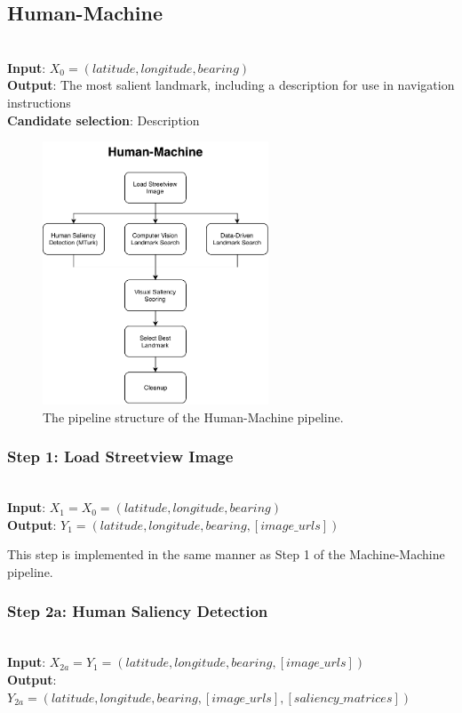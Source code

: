 \subsection{Human-Machine}~\\
\noindent\textbf{Input}: $X_0 = (latitude, longitude, bearing)$\\
\noindent\textbf{Output}: The most salient landmark, including a description for use in navigation instructions\\
\textbf{Candidate selection}: Description

\begin{figure}[htbp]
  \centering
  \includegraphics[width=0.6\textwidth]{pipeline_diagrams/human-machine.pdf}
  \caption{The pipeline structure of the Human-Machine pipeline.}
  \label{fig:pipeline:hm}
\end{figure}

\subsubsection*{Step 1: Load Streetview Image}~\\
\noindent\textbf{Input}: $X_1 = X_0 = (latitude, longitude, bearing)$\\
\textbf{Output}: $Y_1 = (latitude, longitude, bearing, [image\_urls])$

This step is implemented in the same manner as Step 1 of the Machine-Machine pipeline.

\subsubsection*{Step 2a: Human Saliency Detection}~\\ 
\noindent\textbf{Input}: $X_{2a} = Y_1 = (latitude, longitude, bearing, [image\_urls])$\\
\textbf{Output}: $Y_{2a} = (latitude, longitude, bearing, [image\_urls], [saliency\_matrices])$ 

